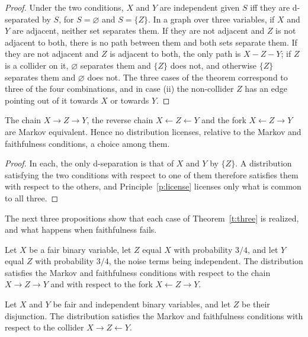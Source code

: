 \documentclass{situationist-preprint}
\begin{document}
\begin{proof}
Under the two conditions, $X$ and $Y$ are independent given $S$ iff they are d-separated by $S$, for $S = \varnothing$ and $S = \{Z\}$. In a graph over three variables, if $X$ and $Y$ are adjacent, neither set separates them. If they are not adjacent and $Z$ is not adjacent to both, there is no path between them and both sets separate them. If they are not adjacent and $Z$ is adjacent to both, the only path is $X - Z - Y$; if $Z$ is a collider on it, $\varnothing$ separates them and $\{Z\}$ does not, and otherwise $\{Z\}$ separates them and $\varnothing$ does not. The three cases of the theorem correspond to three of the four combinations, and in case (ii) the non-collider $Z$ has an edge pointing out of it towards $X$ or towards $Y$.
\end{proof}

\begin{proposition}\label{p:chainfork}
The chain $X \to Z \to Y$, the reverse chain $X \leftarrow Z \leftarrow Y$ and the fork $X \leftarrow Z \to Y$ are Markov equivalent. Hence no distribution licenses, relative to the Markov and faithfulness conditions, a choice among them.
\end{proposition}

\begin{proof}
In each, the only d-separation is that of $X$ and $Y$ by $\{Z\}$. A distribution satisfying the two conditions with respect to one of them therefore satisfies them with respect to the others, and Principle~\ref{p:license} licenses only what is common to all three.
\end{proof}

The next three propositions show that each case of Theorem~\ref{t:three} is realized, and what happens when faithfulness fails.

\begin{proposition}\label{p:exchain}
Let $X$ be a fair binary variable, let $Z$ equal $X$ with probability $3/4$, and let $Y$ equal $Z$ with probability $3/4$, the noise terms being independent. The distribution satisfies the Markov and faithfulness conditions with respect to the chain $X \to Z \to Y$ and with respect to the fork $X \leftarrow Z \to Y$.
\end{proposition}

\begin{proposition}[Collider]\label{p:excollider}
Let $X$ and $Y$ be fair and independent binary variables, and let $Z$ be their disjunction. The distribution satisfies the Markov and faithfulness conditions with respect to the collider $X \to Z \leftarrow Y$.
\end{proposition}
\end{document}
